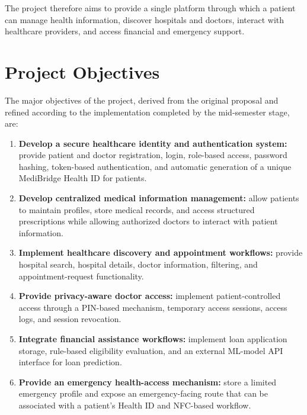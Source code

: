 \documentclass{tietreport}
\begin{document}
The project therefore aims to provide a single platform through which a
patient can manage health information, discover hospitals and doctors,
interact with healthcare providers, and access financial and emergency
support.

\section{Project Objectives}

The major objectives of the project, derived from the original proposal
and refined according to the implementation completed by the
mid-semester stage, are:

\begin{enumerate}
  \item \textbf{Develop a secure healthcare identity and authentication
  system:} provide patient and doctor registration, login, role-based
  access, password hashing, token-based authentication, and automatic
  generation of a unique MediBridge Health ID for patients.

  \item \textbf{Develop centralized medical information management:}
  allow patients to maintain profiles, store medical records, and
  access structured prescriptions while allowing authorized doctors to
  interact with patient information.

  \item \textbf{Implement healthcare discovery and appointment
  workflows:} provide hospital search, hospital details, doctor
  information, filtering, and appointment-request functionality.

  \item \textbf{Provide privacy-aware doctor access:} implement
  patient-controlled access through a PIN-based mechanism, temporary
  access sessions, access logs, and session revocation.

  \item \textbf{Integrate financial assistance workflows:} implement
  loan application storage, rule-based eligibility evaluation, and an
  external ML-model API interface for loan prediction.

  \item \textbf{Provide an emergency health-access mechanism:} store a
  limited emergency profile and expose an emergency-facing route that
  can be associated with a patient's Health ID and NFC-based workflow.
\end{enumerate}

\end{document}
